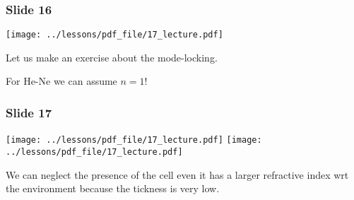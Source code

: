 \documentclass[../main/main.tex]{subfiles}
\begin{document}
\subsubsection*{Slide 16}

\begin{minipage}[]{0.5\linewidth}
\centering
\texttt{[image: ../lessons/pdf\_file/17\_lecture.pdf]}
\end{minipage}
\hspace{0.3cm}\vspace{0.3cm}
\begin{minipage}[c]{0.47\linewidth}

Let us make an exercise about the mode-locking.

For He-Ne we can assume \( n = 1 \)!

\end{minipage}

\subsubsection*{Slide 17}

\begin{minipage}[]{0.5\linewidth}
\centering
\texttt{[image: ../lessons/pdf\_file/17\_lecture.pdf]}
\texttt{[image: ../lessons/pdf\_file/17\_lecture.pdf]}
\end{minipage}
\hspace{0.3cm}\vspace{0.3cm}
\begin{minipage}[c]{0.47\linewidth}

We can neglect the presence of the cell even it has a larger refractive index wrt the environment because the tickness is very low.



\end{minipage}
\end{document}
